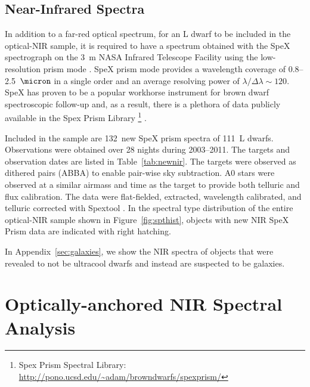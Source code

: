\documentclass[12pt]{aastex6}
\newcommand{\NewPrismSpectra}{132} %
\newcommand{\NewPrismObjects}{111} %
\begin{document}


\subsection{Near-Infrared Spectra}

In addition to a far-red optical spectrum, for an L dwarf to be included in the optical-NIR sample, it is required to have a spectrum obtained with the SpeX spectrograph on the 3~m NASA Infrared Telescope Facility using the low-resolution prism mode \citep{Spex}.
SpeX prism mode provides a wavelength coverage of 0.8--2.5~$\micron$ in a single order and an average resolving power of $\lambda/\Delta\lambda\sim120$.
SpeX has proven to be a popular workhorse instrument for brown dwarf spectroscopic follow-up and, as a result, there is a plethora of data publicly available in the Spex Prism Library \footnote{Spex Prism Spectral Library: \url{http://pono.ucsd.edu/~adam/browndwarfs/spexprism/}} \citep{Burgasser:2014tr}.

\label{sec:obs_new_nir}
Included in the sample are \NewPrismSpectra~new SpeX prism spectra of \NewPrismObjects~L dwarfs.
Observations were obtained over 28 nights during 2003--2011. The targets and observation dates are listed in Table~\ref{tab:newnir}.
The targets were observed as dithered pairs (ABBA) to enable pair-wise sky subtraction. A0 stars were observed at a similar airmass and time as the target to provide both telluric and flux calibration.
The data were flat-fielded, extracted, wavelength calibrated, and telluric corrected with Spextool \citep{Cushing04,Spextool2}.
In the spectral type distribution of the entire optical-NIR sample shown in Figure~\ref{fig:spthist}, objects with new NIR SpeX Prism data are indicated with right hatching.

In Appendix~\ref{sec:galaxies}, we show the NIR spectra of objects that were revealed to not be ultracool dwarfs and instead are suspected to be galaxies.


%

\section{Optically-anchored NIR Spectral Analysis}
\end{document}

